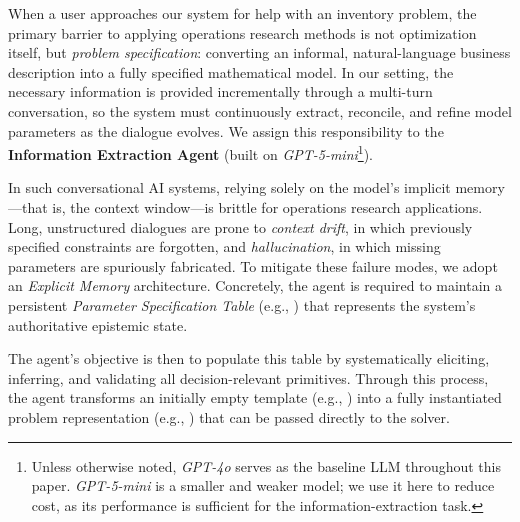     

    When a user approaches our system for help with an inventory problem, the primary barrier to applying operations research methods is not optimization itself, but \emph{problem specification}: converting an informal, natural-language business description into a fully specified mathematical model. In our setting, the necessary information is provided incrementally through a multi-turn conversation, so the system must continuously extract, reconcile, and refine model parameters as the dialogue evolves. We assign this responsibility to the \textbf{Information Extraction Agent} (built on \emph{GPT-5-mini}\footnote{Unless otherwise noted, \emph{GPT-4o} serves as the baseline LLM throughout this paper. \emph{GPT-5-mini} is a smaller and weaker model; we use it here to reduce cost, as its performance is sufficient for the information-extraction task.}).

    In such conversational AI systems, relying solely on the model’s implicit memory---that is, the context window---is brittle for operations research applications. Long, unstructured dialogues are prone to \emph{context drift}, in which previously specified constraints are forgotten, and \emph{hallucination}, in which missing parameters are spuriously fabricated. To mitigate these failure modes, we adopt an \emph{Explicit Memory} architecture. Concretely, the agent is required to maintain a persistent \emph{Parameter Specification Table} (e.g., ) that represents the system’s authoritative epistemic state.
    
    The agent’s objective is then to populate this table by systematically eliciting, inferring, and validating all decision-relevant primitives. Through this process, the agent transforms an initially empty template (e.g., ) into a fully instantiated problem representation (e.g., ) that can be passed directly to the solver.
    
